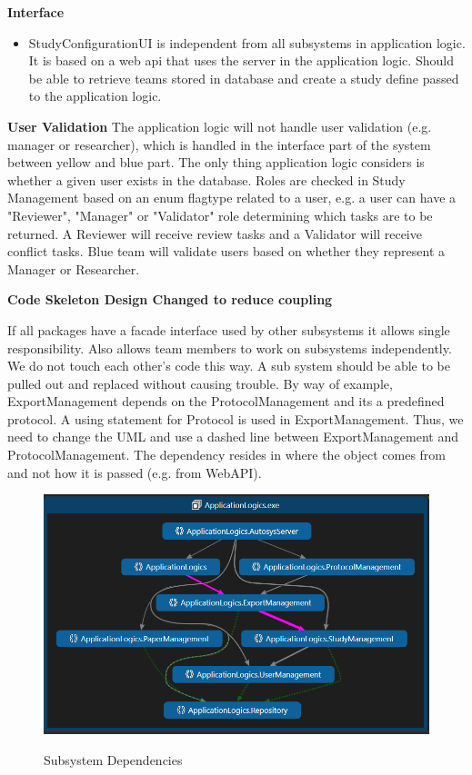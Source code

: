 \textbf{Interface}
\begin{itemize}
	\item StudyConfigurationUI is independent from all subsystems in application logic. It is based on a web api that uses the server in the application logic. Should be able to retrieve teams stored in database and create a study define passed to the application logic. 
\end{itemize} 

\textbf{User Validation}
The application logic will not handle user validation (e.g. manager or researcher), which is handled in the interface part of the system between yellow and blue part. The only thing application logic considers is whether a given user exists in the database. Roles are checked in Study Management based on an enum flagtype related to a user, e.g. a user can have a "Reviewer", "Manager" or "Validator" role determining which tasks are to be returned. A Reviewer will receive review tasks and a Validator will receive conflict tasks. Blue team will validate users based on whether they represent a Manager or Researcher. 

\newpage

\textbf{Code Skeleton Design Changed to reduce coupling}

If all packages have a facade interface used by other subsystems it allows single responsibility. Also allows team members to work on subsystems independently. We do not touch each other's code this way. A sub system should be able to be pulled out and replaced without causing trouble. By way of example, ExportManagement depends on the ProtocolManagement and its a predefined protocol. A using statement for Protocol is used in ExportManagement. Thus, we need to change the UML and use a dashed line between ExportManagement and ProtocolManagement. The dependency resides in where the object comes from and not how it is passed (e.g. from WebAPI). 

\begin{figure}[H]
	\includegraphics[width = 31 em]{image/oldsubsystemdependencies}
	\label{fig:Subsystem Dependencies}
	\caption{Subsystem Dependencies}
\end{figure}
